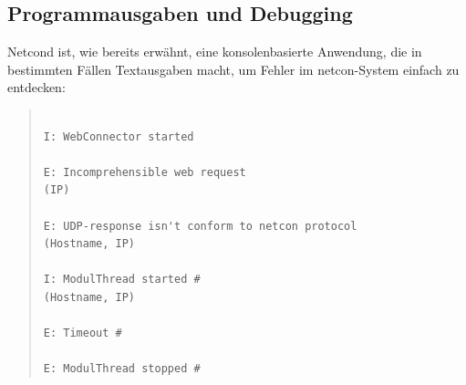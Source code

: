 \documentclass[a4paper,14pt,headsepline]{scrartcl}
\begin{document}
\begin{figure}[h]
\begin{center}
\end{center}
\end{figure}

\begin{figure}[h]
\begin{center}
\end{center}
\end{figure}

\newpage

\subsection{Programmausgaben und Debugging}

Netcond ist, wie bereits erwähnt, eine konsolenbasierte Anwendung, die in bestimmten Fällen Textausgaben macht, um Fehler im netcon-System einfach zu entdecken:

\begin{quote}
\begin{verbatim}

I: WebConnector started

E: Incomprehensible web request
(IP)

E: UDP-response isn't conform to netcon protocol
(Hostname, IP)

I: ModulThread started #
(Hostname, IP)

E: Timeout #

E: ModulThread stopped # 

\end{verbatim}
\end{quote} 
\end{document}
